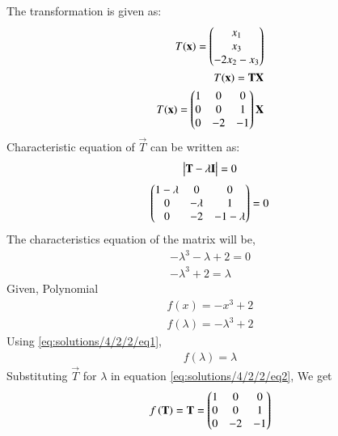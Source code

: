 The transformation is given as:
\begin{align}
T(\mathbf{x})=\begin{pmatrix}x_1\\x_3\\-2x_2-x_3\end{pmatrix}\\
T(\mathbf{x})=\mathbf{T}\mathbf{X}\\
T(\mathbf{x})=\begin{pmatrix}1&0&0\\0&0&1\\0&-2&-1\end{pmatrix}\mathbf{X}
\end{align}
Characteristic equation of $\vec{T}$ can be written as:
\begin{align}
    \begin{vmatrix}\mathbf{T}-\lambda\mathbf{I}\end{vmatrix}=0
\end{align}
\begin{align}
    \begin{pmatrix}1-\lambda&0&0\\0&-\lambda&1\\0&-2&-1-\lambda\end{pmatrix}=0
\end{align}
 The characteristics equation of the matrix will  be,
 \begin{align}
     -\lambda^{3}-\lambda + 2 = 0\\
     -\lambda^{3}+2=\lambda \label{eq:solutions/4/2/2/eq1}
 \end{align}
Given, Polynomial
 \begin{align}
 f(x)=-x^3+2\\
 f(\lambda)=-\lambda^{3}+2
 \end{align}
 Using \ref{eq:solutions/4/2/2/eq1},
 \begin{align}
 f(\lambda)=\lambda \label{eq:solutions/4/2/2/eq2}
     \end{align}
Substituting $\vec{T}$ for $\lambda$ in equation \ref{eq:solutions/4/2/2/eq2}, We get
     \begin{align}
     f\left(\mathbf{T}\right)=\mathbf{T}=\begin{pmatrix}1&0&0\\0&0&1\\0&-2&-1\end{pmatrix}
 \end{align}
